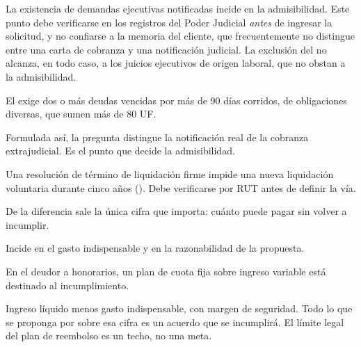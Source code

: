 \begin{alerta}
La existencia de demandas ejecutivas notificadas incide en la admisibilidad. Este punto
debe verificarse en los registros del Poder Judicial \emph{antes} de ingresar la
solicitud, y no confiarse a la memoria del cliente, que frecuentemente no distingue entre
una carta de cobranza y una notificación judicial. La exclusión del  no alcanza,
en todo caso, a los juicios ejecutivos de origen laboral, que no obstan a la admisibilidad.
\end{alerta}

\bloqueEntrevista

\begin{cuestionario}[Admisibilidad]
  {El  exige dos o más deudas vencidas por más de 90 días corridos, de
  obligaciones diversas, que sumen más de 80 UF.}

  {Formulada así, la pregunta distingue la notificación real de la cobranza
  extrajudicial. Es el punto que decide la admisibilidad.}

  {Una resolución de término de liquidación firme impide una nueva liquidación voluntaria
  durante cinco años (). Debe verificarse por RUT antes de definir la vía.}
\end{cuestionario}

\begin{cuestionario}
  {De la diferencia sale la única cifra que importa: cuánto puede pagar sin volver a
  incumplir.}

  {Incide en el gasto indispensable y en la razonabilidad de la propuesta.}

  {En el deudor a honorarios, un plan de cuota fija sobre ingreso variable está destinado
  al incumplimiento.}
\end{cuestionario}

\begin{foco}
Ingreso líquido menos gasto indispensable, con margen de seguridad. Todo lo que se
proponga por sobre esa cifra es un acuerdo que se incumplirá. El límite legal del plan de
reembolso es un techo, no una meta.
\end{foco}

